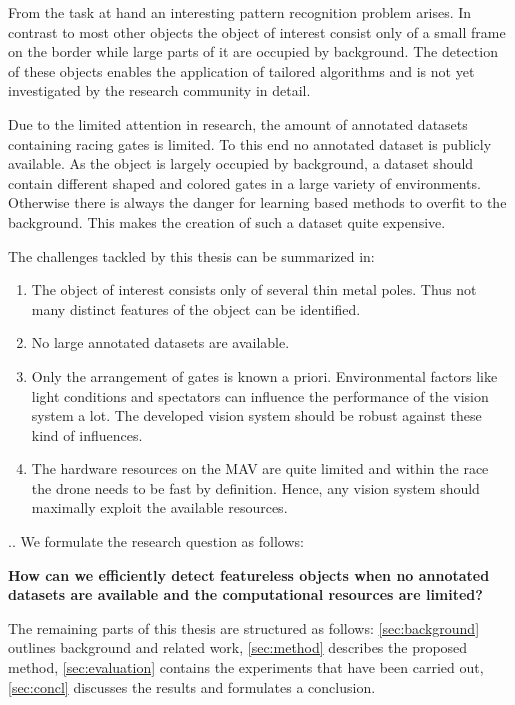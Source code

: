 From the task at hand an interesting pattern recognition problem arises. In contrast to most other objects the object of interest consist only of a small frame on the border while large parts of it are occupied by background. The detection of these objects enables the application of tailored algorithms and is not yet investigated by the research community in detail.

Due to the limited attention in research, the amount of annotated datasets containing racing gates is limited. To this end no annotated dataset is publicly available. As the object is largely occupied by background, a dataset should contain different shaped and colored gates in a large variety of environments. Otherwise there is always the danger for learning based methods to overfit to the background. This makes the creation of such a dataset quite expensive.

The challenges tackled by this thesis can be summarized in:
\begin{enumerate}
	\item The object of interest consists only of several thin metal poles. Thus not many distinct features of the object can be identified.
	\item No large annotated datasets are available. 
	\item Only the arrangement of gates is known a priori. Environmental factors like light conditions and spectators can influence the performance of the vision system a lot. The developed vision system should be robust against these kind of influences.
	\item The hardware resources on the MAV are quite limited and within the race the drone needs to be fast by definition. Hence, any vision system should maximally exploit the available resources.
\end{enumerate} 


.. We formulate the research question as follows:

\textbf{How can we efficiently detect featureless objects when no annotated datasets are available and the computational resources are limited?}


The remaining parts of this thesis are structured as follows: \autoref{sec:background} outlines background and related work, \autoref{sec:method} describes the proposed method, \autoref{sec:evaluation} contains the  experiments that have been carried out, \autoref{sec:concl} discusses the results and formulates a conclusion.
